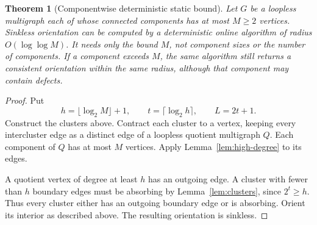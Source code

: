 \documentclass[11pt]{article}
\newtheorem{theorem}{Theorem}[section]
\theoremstyle{definition}
\begin{document}
\begin{theorem}[Componentwise deterministic static bound]\label{thm:static-det}
Let $G$ be a loopless multigraph each of whose connected components has at
most $M\ge2$ vertices. Sinkless orientation can be computed by a deterministic
online algorithm of radius $O(\log\log M)$. It needs only the bound $M$,
not component sizes or the number of components. If a component exceeds
$M$, the same algorithm still returns a consistent orientation within the
same radius, although that component may contain defects.
\end{theorem}
\begin{proof}
Put
\[
 h=\lfloor\log_2 M\rfloor+1,\qquad
 t=\lceil\log_2 h\rceil,\qquad L=2t+1.
\]
Construct the clusters above. Contract each cluster to a vertex, keeping
every intercluster edge as a distinct edge of a loopless quotient multigraph
$Q$. Each component of $Q$ has at most $M$ vertices. Apply
Lemma~\ref{lem:high-degree} to its edges.

A quotient vertex of degree at least $h$ has an outgoing edge. A cluster
with fewer than $h$ boundary edges must be absorbing by
Lemma~\ref{lem:clusters}, since $2^t\ge h$. Thus every cluster either has
an outgoing boundary edge or is absorbing. Orient its interior as described
above. The resulting orientation is sinkless.


\end{proof}
\end{document}
